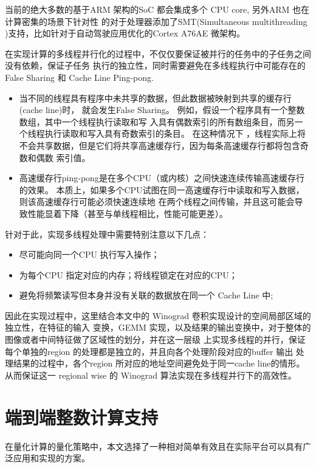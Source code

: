 当前的绝大多数的基于ARM 架构的SoC 都会集成多个 CPU core, 另外ARM 也在计算密集的场景下针对性
的对于处理器添加了SMT(Simultaneous multithreading )支持，比如针对于自动驾驶应用优化的Cortex 
A76AE 微架构。

在实现计算的多线程并行化的过程中，不仅仅要保证被并行的任务中的子任务之间没有依赖，保证子任务
执行的独立性，同时需要避免在多线程执行中可能存在的 False Sharing 和 Cache Line Ping-pong.

\begin{itemize}
  \item 当不同的线程具有程序中未共享的数据，但此数据被映射到共享的缓存行(cache line)时，
  就会发生False Sharing。 例如，假设一个程序具有一个整数数组，其中一个线程执行读取和写
  入具有偶数索引的所有数组条目，而另一个线程执行读取和写入具有奇数索引的条目。 在这种情况下
  ，线程实际上将不会共享数据，但是它们将共享高速缓存行，因为每条高速缓存行都将包含奇数和偶数
  索引值。
  \item 高速缓存行ping-pong是在多个CPU（或内核）之间快速连续传输高速缓存行的效果。
  本质上，如果多个CPU试图在同一高速缓存行中读取和写入数据，则该高速缓存行可能必须快速连续地
  在两个线程之间传输，并且这可能会导致性能显着下降（甚至与单线程相比，性能可能更差）。
\end{itemize}

针对于此，实现多线程处理中需要特别注意以下几点：

\begin{itemize}
    \item 尽可能向同一个CPU 执行写入操作；
    \item 为每个CPU 指定对应的内存；将线程锁定在对应的CPU；
    \item 避免将频繁读写但本身并没有关联的数据放在同一个 Cache Line 中;
\end{itemize}

因此在实现过程中，这里结合本文中的 Winograd 卷积实现设计的空间局部区域的独立性，在特征的输入
变换，GEMM 实现，以及结果的输出变换中，对于整体的图像或者中间特征做了区域性的划分，并在这一层级
上实现多线程的并行，保证每个单独的region 的处理都是独立的，并且向各个处理阶段对应的buffer 输出
处理结果的过程中，各个region 所对应的地址空间避免处于同一cache line的情形。从而保证这一 regional wise
的 Winograd 算法实现在多线程并行下的高效性。


\section{端到端整数计算支持}

在量化计算的量化策略中，本文选择了一种相对简单有效且在实际平台可以具有广泛应用和实现的方案。

